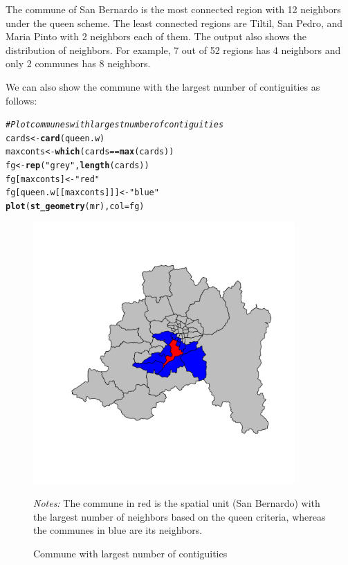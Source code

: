 \documentclass[english,12pt]{book}\usepackage[]{graphicx}\usepackage[]{xcolor}
\makeatletter
\newcommand{\hlstr}[1]{\textcolor[rgb]{0.192,0.494,0.8}{#1}}%
\newcommand{\hlcom}[1]{\textcolor[rgb]{0.678,0.584,0.686}{\textit{#1}}}%
\newcommand{\hlopt}[1]{\textcolor[rgb]{0,0,0}{#1}}%
\newcommand{\hlstd}[1]{\textcolor[rgb]{0.345,0.345,0.345}{#1}}%
\newcommand{\hlkwb}[1]{\textcolor[rgb]{0.69,0.353,0.396}{#1}}%
\newcommand{\hlkwc}[1]{\textcolor[rgb]{0.333,0.667,0.333}{#1}}%
\newcommand{\hlkwd}[1]{\textcolor[rgb]{0.737,0.353,0.396}{\textbf{#1}}}%
\newenvironment{kframe}{%
 \def\at@end@of@kframe{}%
 \ifinner\ifhmode%
  \def\at@end@of@kframe{\end{minipage}}%
  \begin{minipage}{\columnwidth}%
 \fi\fi%
 \def\FrameCommand##1{\hskip\@totalleftmargin \hskip-\fboxsep
 \colorbox{shadecolor}{##1}\hskip-\fboxsep
     \hskip-\linewidth \hskip-\@totalleftmargin \hskip\columnwidth}%
 \MakeFramed {\advance\hsize-\width
   \@totalleftmargin\z@ \linewidth\hsize
   \@setminipage}}%
 {\par\unskip\endMakeFramed%
 \at@end@of@kframe}
\newenvironment{knitrout}{}{} %
\makeatother
\begin{document}
The commune of San Bernardo is the most connected region with 12 neighbors under the queen scheme. The least connected regions are Tiltil, San Pedro, and Maria Pinto with 2 neighbors each of them. The output also shows the distribution of neighbors.  For example, 7 out of 52 regions has 4 neighbors and only 2 communes has 8 neighbors.  

We can also show the commune with the largest number of contiguities as follows:

\begin{knitrout}
\color{fgcolor}\begin{kframe}
\begin{alltt}
\hlcom{# Plot communes with largest number of contiguities}
\hlstd{cards} \hlkwb{<-} \hlkwd{card}\hlstd{(queen.w)}
\hlstd{maxconts} \hlkwb{<-} \hlkwd{which}\hlstd{(cards} \hlopt{==} \hlkwd{max}\hlstd{(cards))}
\hlstd{fg} \hlkwb{<-} \hlkwd{rep}\hlstd{(}\hlstr{"grey"}\hlstd{,} \hlkwd{length}\hlstd{(cards))}
\hlstd{fg[maxconts]} \hlkwb{<-} \hlstr{"red"}
\hlstd{fg[queen.w[[maxconts]]]} \hlkwb{<-} \hlstr{"blue"}
\hlkwd{plot}\hlstd{(}\hlkwd{st_geometry}\hlstd{(mr),} \hlkwc{col} \hlstd{= fg)}
\end{alltt}
\end{kframe}
\end{knitrout}

\begin{figure}[ht]
  \caption{Commune with largest number of contiguities}
    \label{fig:plot_nn}
    \centering
        	\begin{minipage}{1\linewidth}
\begin{knitrout}
\color{fgcolor}

{\centering \includegraphics[width=10cm,height=10cm]{figure/neight-1} 

}


\end{knitrout}
\footnotesize
		\emph{Notes:} The commune in red is the spatial unit (San Bernardo) with the largest number of neighbors based on the queen criteria, whereas the communes in blue are its neighbors. 
	\end{minipage}	
\end{figure}
\end{document}
